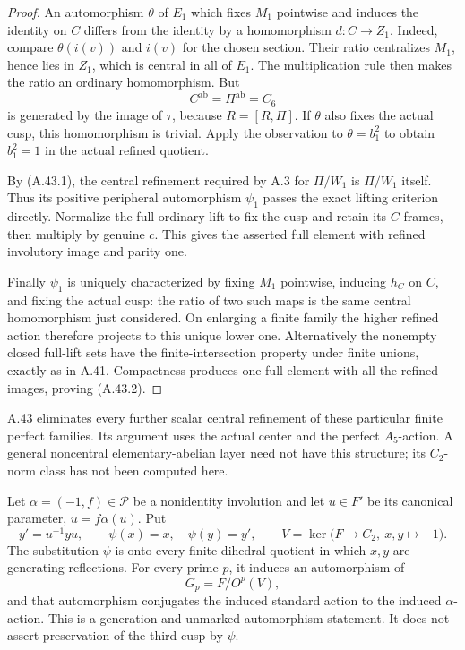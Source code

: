 \begin{proof}
An automorphism \(\theta\) of \(E_1\) which
fixes \(M_1\) pointwise and induces the identity
on \(C\) differs from the identity by a
homomorphism \(d:C\to Z_1\). Indeed, compare
\(\theta(i(v))\) and \(i(v)\) for the chosen
section. Their ratio centralizes \(M_1\),
hence lies in \(Z_1\), which is central in
all of \(E_1\). The multiplication rule then
makes the ratio an ordinary homomorphism.
But
\[
                  C^{\mathrm{ab}}=\Pi^{\mathrm{ab}}=C_6
\]
is generated by the image of \(\tau\), because
\(R=[R,\Pi]\). If \(\theta\) also fixes the
actual cusp, this homomorphism is trivial.
Apply the observation to \(\theta=b_1^2\)
to obtain \(b_1^2=1\) in the actual refined
quotient.

By (A.43.1), the central refinement required by
A.3 for \(\Pi/W_1\) is \(\Pi/W_1\) itself.
Thus its positive peripheral automorphism
\(\psi_1\) passes the exact lifting criterion
directly. Normalize the full ordinary lift to
fix the cusp and retain its \(C\)-frames, then
multiply by genuine \(c\). This gives the
asserted full element with refined involutory
image and parity one.

Finally \(\psi_1\) is uniquely characterized
by fixing \(M_1\) pointwise, inducing \(h_C\)
on \(C\), and fixing the actual cusp: the
ratio of two such maps is the same central
homomorphism just considered. On enlarging a
finite family the higher refined action
therefore projects to this unique lower one.
Alternatively the nonempty closed full-lift
sets have the finite-intersection property
under finite unions, exactly as in A.41.
Compactness produces one full element with
all the refined images, proving (A.43.2).
\end{proof}

A.43 eliminates every further scalar central
refinement of these particular finite perfect
families. Its argument uses the actual center
and the perfect \(A_5\)-action. A general
noncentral elementary-abelian layer need not
have this structure; its \(C_2\)-norm class
has not been computed here.

Let \(\alpha=(-1,f)\in\mathcal P\) be a nonidentity
involution and let \(u\in F'\) be its canonical
parameter, \(u=f\alpha(u)\). Put
\[
 y'=u^{-1}yu,\qquad \psi(x)=x,\quad\psi(y)=y',
 \qquad V=\ker\bigl(F\to C_2,\ x,y\mapsto-1\bigr).
\]
The substitution \(\psi\) is onto every finite
dihedral quotient in which \(x,y\) are generating
reflections. For every prime \(p\), it induces
an automorphism of
\[
                         G_p=F/O^p(V),
 \tag{A.44.1}
\]
and that automorphism conjugates the induced
standard action to the induced \(\alpha\)-action.
This is a generation and unmarked automorphism
statement. It does not assert preservation of
the third cusp by \(\psi\).

